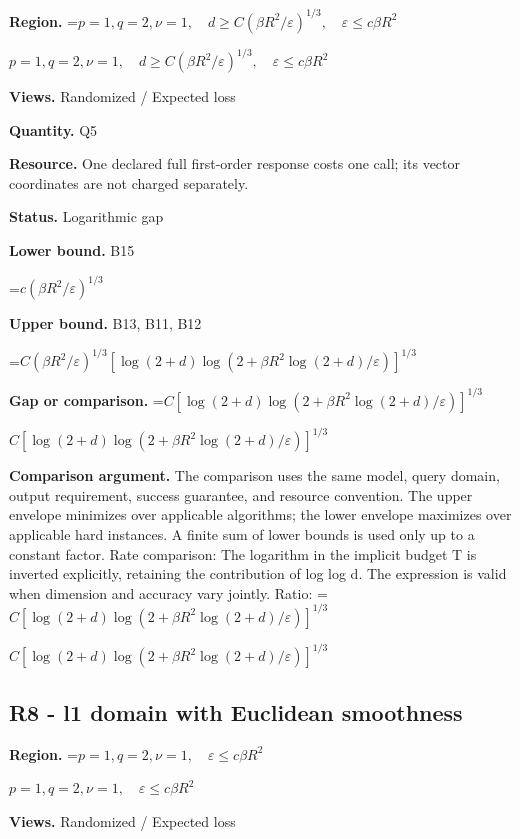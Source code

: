 \documentclass[10pt,a4paper]{article}
\newcommand{\AtlasMath}[1]{\par\begingroup\centering\setbox0=\hbox{$\displaystyle #1$}\ifdim\wd0>1.4\linewidth\typeout{ATLAS WIDE FORMULA: \the\wd0}\fi\ifdim\wd0>\linewidth\resizebox{\linewidth}{!}{\box0}\else\box0\fi\par\endgroup}
\newcommand{\AtlasInlineMath}[1]{\begingroup\setbox0=\hbox{$#1$}\ifdim\wd0>.4\linewidth\endgroup\AtlasMath{#1}\else\endgroup$#1$\fi}
\begin{document}
\textbf{Region.} \AtlasInlineMath{p=1,q=2,\nu=1,\quad d\ge C(\beta R^2/\varepsilon)^{1/3},\quad\varepsilon\le c\beta R^2}



\textbf{Views.} Randomized / Expected loss



\textbf{Quantity.} Q5



\textbf{Resource.} One declared full first-order response costs one call; its vector coordinates are not charged separately.



\textbf{Status.} Logarithmic gap



\textbf{Lower bound.} B15



\AtlasMath{c(\beta R^2/\varepsilon)^{1/3}}


\textbf{Upper bound.} B13, B11, B12



\AtlasMath{C(\beta R^2/\varepsilon)^{1/3}[\log(2+d)\log(2+\beta R^2\log(2+d)/\varepsilon)]^{1/3}}


\textbf{Gap or comparison.} \AtlasInlineMath{C[\log(2+d)\log(2+\beta R^2\log(2+d)/\varepsilon)]^{1/3}}



\textbf{Comparison argument.} The comparison uses the same model, query domain, output requirement, success guarantee, and resource convention. The upper envelope minimizes over applicable algorithms; the lower envelope maximizes over applicable hard instances. A finite sum of lower bounds is used only up to a constant factor. Rate comparison: The logarithm in the implicit budget T is inverted explicitly, retaining the contribution of log log d. The expression is valid when dimension and accuracy vary jointly. Ratio: \AtlasInlineMath{C[\log(2+d)\log(2+\beta R^2\log(2+d)/\varepsilon)]^{1/3}}



\subsection{R8 - l1 domain with Euclidean smoothness}


\textbf{Region.} \AtlasInlineMath{p=1,q=2,\nu=1,\quad\varepsilon\le c\beta R^2}



\textbf{Views.} Randomized / Expected loss
\end{document}
